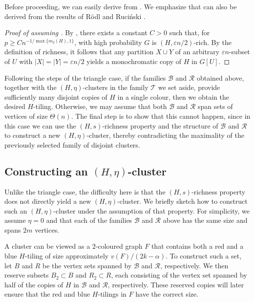 \documentclass[a4paper,reqno,11pt]{amsart}
\theoremstyle{definition}
\theoremstyle{remark}
\newcommand\cB{\mathcal{B}}
\newcommand\cR{\mathcal{R}}
\renewcommand\ge{\geqslant}
\begin{document}
Before proceeding, we can easily derive  from . We emphasize that  can also be derived from the results of R\"{o}dl and Ruci\'{n}ski \cite{RR93, RR94, RR95}.

\begin{proof}[Proof of  assuming ]
By , there exists a constant $C>0$ such that, for \mbox{$p\ge Cn^{-1/\max\{m_2(H),1\}}$}, with high probability $G$ is $(H,\varepsilon n/2)$-rich. By the definition of richness, it follows that any partition $X \cup Y$ of an arbitrary $\varepsilon n$-subset of $U$ with $|X|=|Y|=\varepsilon n/2$ yields a monochromatic copy of $H$ in $G[U]$.
\end{proof}

Following the steps of the triangle case, if the families $\cB$ and $\cR$ obtained above, together with the $(H,\eta)$-clusters in the family $\mathcal{T}$ we set aside, provide sufficiently many disjoint copies of $H$ in a single colour, then we obtain the desired $H$-tiling. Otherwise, we may assume that both $\cB$ and $\cR$ span sets of vertices of size $\Theta(n)$. The final step is to show that this cannot happen, since in this case we can use the $(H,s)$-richness property and the structure of $\cB$ and $\cR$ to construct a new $(H,\eta)$-cluster, thereby contradicting the maximality of the previously selected family of disjoint clusters.

\subsection{Constructing an $(H,\eta)$-cluster}\label{subsec:2.3} Unlike the triangle case, the difficulty here is that the $(H,s)$-richness property does not directly yield a new $(H,\eta)$-cluster. We briefly sketch how to construct such an $(H,\eta)$-cluster under the assumption of that property. For simplicity, we assume $\eta = 0$ and that each of the families $\cB$ and $\cR$ above has the same size and spans $2m$ vertices.

A cluster can be viewed as a $2$-coloured graph $F$ that contains both a red and a blue $H$-tiling of size approximately $v(F)/(2k-\alpha)$. To construct such a set, let $B$ and $R$ be the vertex sets spanned by $\cB$ and $\cR$, respectively. We then reserve subsets $B_2 \subset B$ and $R_2 \subset R$, each consisting of the vertex set spanned by half of the copies of $H$ in $\cB$ and $\cR$, respectively. These reserved copies will later ensure that the red and blue $H$-tilings in $F$ have the correct size.
\end{document}
